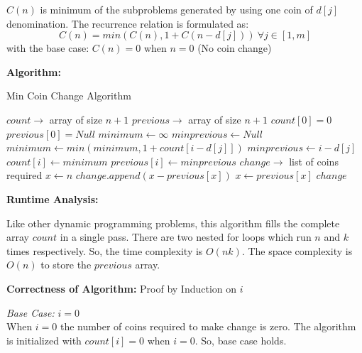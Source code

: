 \documentclass[a4paper]{article}
\begin{document}
\begin{enumerate}[1.]
    $C(n)$ is minimum of the subproblems generated by using one coin of $d[j]$ denomination. The recurrence relation is formulated as:
    \begin{equation}
        C(n) = min(C(n) , 1+C(n-d[j]))~\forall j \in [1,m]
    \end{equation}
    with the base case:
    $C(n) = 0$ when $n=0$ (No coin change)

    
    \textbf{Algorithm:}
    
    {\centering
    \begin{minipage}{\linewidth}
    \begin{algorithm}[H]
    \caption{Min Coin Change Algorithm}\label{alg:mc}
    \begin{algorithmic}[1]
    \State $count \to$ array of size $n+1$
    \State $previous \to$ array of size $n+1$
    \State $count[0] = 0$
    \State $previous[0] = Null$
        \State $minimum \gets \infty$
        \State $minprevious \gets Null$
                \State $minimum \gets min(minimum,1+count[i-d[j]])$
                \State $minprevious \gets i-d[j]$
            \EndIf
        \EndFor
        \State $count[i] \gets minimum$
        \State $previous[i] \gets minprevious$
    \EndFor
    \State $change \to$ list of coins required 
    \State $x \gets n$
        \State $change.append(x-previous[x])$
        \State $x \gets previous[x]$
    \EndWhile
    \State \Return $change$
    \EndProcedure
    \end{algorithmic}
    \end{algorithm}
    \end{minipage}
    \par}
    
    \textbf{Runtime Analysis:}
    
    Like other dynamic programming problems, this algorithm fills the complete array $count$ in a single pass. There are two nested for loops which run $n$ and $k$ times respectively. So, the time complexity is $O(nk)$. The space complexity is $O(n)$ to store the $previous$ array.
    
    \textbf{Correctness of Algorithm:} Proof by Induction on $i$
    
    \textit{Base Case:} $i=0$\\ When $i=0$ the number of coins required to make change is zero. The algorithm is initialized with $count[i]=0$ when $i=0$. So, base case holds.
    

\end{enumerate}
\end{document}
